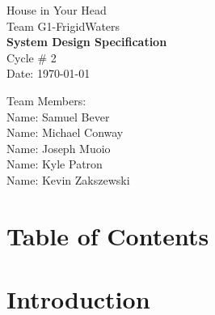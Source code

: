 \documentclass{article}
\begin{document}
\begin{titlepage}
    \begin{center}
        \begin{huge}
        House in Your Head \\[1cm]
        Team G1-FrigidWaters \\[2.2cm]
        { \bfseries System Design Specification } \\[1cm]
        Cycle \# 2\\[2.2cm]
        Date: \required\today\\[1cm]
        \end{huge}
    \end{center}
    \null \vfill
    \begin{large}
        Team Members: \\[0.5cm]
        Name: Samuel Bever\\[0.5cm]
        Name: Michael Conway\\[0.5cm]
        Name: Joseph Muoio\\[0.5cm]
        Name: Kyle Patron\\[0.5cm]
        Name: Kevin Zakszewski
    \end{large}
\end{titlepage}
\section*{\centering Table of Contents}
\makeatletter
{}
\newcommand{\hsubsubsection}{
\@startsection{subsubsection}{3}{\z@}%
                                     {-3.25ex\@plus -1ex \@minus -.2ex}%
                                     {-1.5ex \@plus -.2ex}%
                                     {R\normalfont\normalsize}}
\newcommand{\hparagraph}{
\@startsection{paragraph}{4}{\z@}%
                                     {-3.25ex\@plus -1ex \@minus -.2ex}%
                                     {-1.5ex \@plus -.2ex}%
                                     {R\normalfont\normalsize}}
\newcommand{\hsubparagraph}{
\@startsection{subparagraph}{5}{\z@}%
                                     {-3.25ex\@plus -1ex \@minus -.2ex}%
                                     {-1.5ex \@plus -.2ex}%
                                     {R\normalfont\normalsize}}
\setcounter{secnumdepth}{5}
\makeatother
\newpage
 

\section{Introduction}
\end{document}
